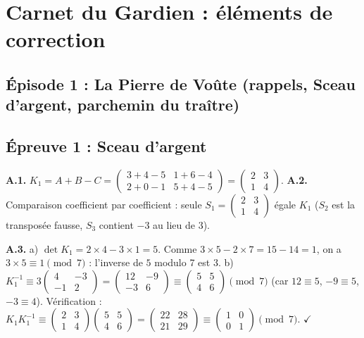 \documentclass[11pt,a4paper]{article}
\begin{document}
\section*{\textcolor{argent}{Carnet du Gardien : éléments de correction}}

\subsection*{Épisode 1 : La Pierre de Voûte (rappels, Sceau d'argent, parchemin du traître)}
\subsection*{Épreuve 1 : Sceau d'argent}
\textbf{A.1.} $K_1 = A + B - C
= \begin{pmatrix}3+4-5 & 1+6-4\\ 2+0-1 & 5+4-5\end{pmatrix}
= \begin{pmatrix}2&3\\1&4\end{pmatrix}$.\quad
\textbf{A.2.} Comparaison coefficient par coefficient :
seule $S_1 = \begin{pmatrix}2&3\\1&4\end{pmatrix}$ égale $K_1$
($S_2$ est la transposée fausse, $S_3$ contient $-3$ au lieu de $3$).

\textbf{A.3.} a) $\det K_1 = 2\times 4 - 3\times 1 = 5$.
Comme $3\times 5 - 2\times 7 = 15 - 14 = 1$, on a
$3\times 5 \equiv 1 \pmod 7$ : l'inverse de $5$ modulo 7 est $3$.
b) $K_1^{-1} \equiv 3\begin{pmatrix}4&-3\\-1&2\end{pmatrix}
= \begin{pmatrix}12&-9\\-3&6\end{pmatrix}
\equiv \begin{pmatrix}5&5\\4&6\end{pmatrix} \pmod 7$
(car $12\equiv 5$, $-9\equiv 5$, $-3\equiv 4$).
Vérification :
$K_1 K_1^{-1} \equiv \begin{pmatrix}2&3\\1&4\end{pmatrix}
\begin{pmatrix}5&5\\4&6\end{pmatrix}
= \begin{pmatrix}22&28\\21&29\end{pmatrix}
\equiv \begin{pmatrix}1&0\\0&1\end{pmatrix} \pmod 7$. $\checkmark$
\end{document}
